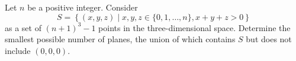 Let $ n$ be a positive integer. Consider\[ S = \left\{ (x,y,z) \mid x,y,z \in \{ 0, 1, \ldots, n\}, x + y + z > 0 \right \}
\]
as a set of $ (n + 1)^{3} - 1$ points in the three-dimensional space. Determine the smallest possible number of planes, the union of which contains $ S$ but does not include $ (0,0,0)$.
